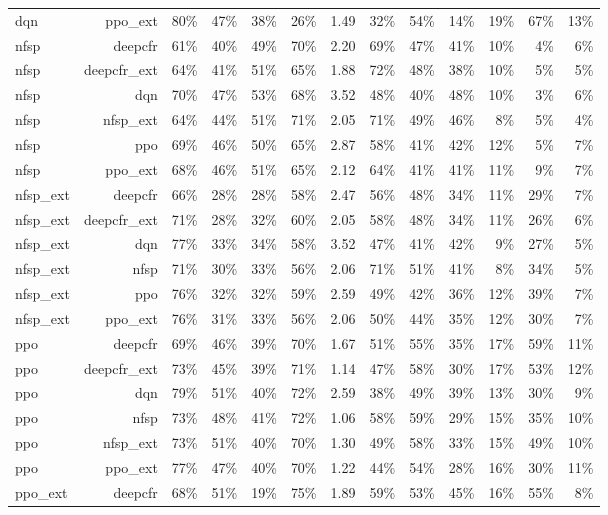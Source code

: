 \begin{tabular}{lrrrrrrrrrrrr}
dqn & ppo\_ext & 80\% & 47\% & 38\% & 26\% & 1.49 & 32\% & 54\% & 14\% & 19\% & 67\% & 13\% \\
nfsp & deepcfr & 61\% & 40\% & 49\% & 70\% & 2.20 & 69\% & 47\% & 41\% & 10\% & 4\% & 6\% \\
nfsp & deepcfr\_ext & 64\% & 41\% & 51\% & 65\% & 1.88 & 72\% & 48\% & 38\% & 10\% & 5\% & 5\% \\
nfsp & dqn & 70\% & 47\% & 53\% & 68\% & 3.52 & 48\% & 40\% & 48\% & 10\% & 3\% & 6\% \\
nfsp & nfsp\_ext & 64\% & 44\% & 51\% & 71\% & 2.05 & 71\% & 49\% & 46\% & 8\% & 5\% & 4\% \\
nfsp & ppo & 69\% & 46\% & 50\% & 65\% & 2.87 & 58\% & 41\% & 42\% & 12\% & 5\% & 7\% \\
nfsp & ppo\_ext & 68\% & 46\% & 51\% & 65\% & 2.12 & 64\% & 41\% & 41\% & 11\% & 9\% & 7\% \\
nfsp\_ext & deepcfr & 66\% & 28\% & 28\% & 58\% & 2.47 & 56\% & 48\% & 34\% & 11\% & 29\% & 7\% \\
nfsp\_ext & deepcfr\_ext & 71\% & 28\% & 32\% & 60\% & 2.05 & 58\% & 48\% & 34\% & 11\% & 26\% & 6\% \\
nfsp\_ext & dqn & 77\% & 33\% & 34\% & 58\% & 3.52 & 47\% & 41\% & 42\% & 9\% & 27\% & 5\% \\
nfsp\_ext & nfsp & 71\% & 30\% & 33\% & 56\% & 2.06 & 71\% & 51\% & 41\% & 8\% & 34\% & 5\% \\
nfsp\_ext & ppo & 76\% & 32\% & 32\% & 59\% & 2.59 & 49\% & 42\% & 36\% & 12\% & 39\% & 7\% \\
nfsp\_ext & ppo\_ext & 76\% & 31\% & 33\% & 56\% & 2.06 & 50\% & 44\% & 35\% & 12\% & 30\% & 7\% \\
ppo & deepcfr & 69\% & 46\% & 39\% & 70\% & 1.67 & 51\% & 55\% & 35\% & 17\% & 59\% & 11\% \\
ppo & deepcfr\_ext & 73\% & 45\% & 39\% & 71\% & 1.14 & 47\% & 58\% & 30\% & 17\% & 53\% & 12\% \\
ppo & dqn & 79\% & 51\% & 40\% & 72\% & 2.59 & 38\% & 49\% & 39\% & 13\% & 30\% & 9\% \\
ppo & nfsp & 73\% & 48\% & 41\% & 72\% & 1.06 & 58\% & 59\% & 29\% & 15\% & 35\% & 10\% \\
ppo & nfsp\_ext & 73\% & 51\% & 40\% & 70\% & 1.30 & 49\% & 58\% & 33\% & 15\% & 49\% & 10\% \\
ppo & ppo\_ext & 77\% & 47\% & 40\% & 70\% & 1.22 & 44\% & 54\% & 28\% & 16\% & 30\% & 11\% \\
ppo\_ext & deepcfr & 68\% & 51\% & 19\% & 75\% & 1.89 & 59\% & 53\% & 45\% & 16\% & 55\% & 8\% \\

\end{tabular}
